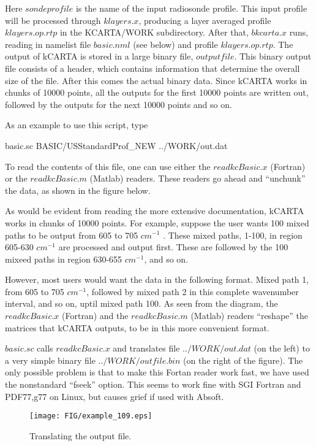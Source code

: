 \documentclass[11pt]{article}
\newcommand{\kc}{\textsf{kCARTA}\xspace}
\begin{document}
Here $sondeprofile$ is the name of the input radiosonde profile. 
This input profile will be processed through $klayers.x$, producing a layer
averaged profile $klayers.op.rtp$ in the KCARTA/WORK subdirectory. After that,
$bkcarta.x$ runs, reading in namelist file $basic.nml$ (see below) and profile
$klayers.op.rtp$. The output of \kc is stored in a large binary file,
$outputfile$.  This binary output file consists of a header, which
contains information that determine the overall size of the file. After this 
comes the actual binary data. Since \kc works in chunks of 10000 points, 
all the outputs for the first 10000 points are written out, followed by the
outputs for the next 10000 points and so on. 

As an example to use this script, type 
\begin{center}
basic.sc BASIC/USStandardProf\_NEW ../WORK/out.dat
\end{center}

To read the contents of this file, one can use either the $readkcBasic.x$ 
(Fortran) or the $readkcBasic.m$ (Matlab) readers. These readers go ahead 
and ``unchunk'' the data, as shown in the figure below. 

As would be evident from reading the more extensive documentation, \kc works 
in chunks of 10000 points. For example, suppose the user wants 100 mixed 
paths to be output from 605 to 705 $cm^{-1}$ . These mixed paths, 1-100, in 
region 605-630 $cm^{-1}$ are processed and output first. These are followed 
by the 100 mixeed paths in region 630-655 $cm^{-1}$, and so on.

However, most users would want the data in the following format. Mixed path 
1, from 605 to 705 $cm^{-1}$, followed by mixed path 2 in this complete 
wavenumber interval, and so on, uptil mixed path 100. As seen from the 
diagram, the  $readkcBasic.x$ (Fortran) and the $readkcBasic.m$ (Matlab) 
readers ``reshape'' the matrices that \kc outputs, to be in this more
convenient format.

$basic.sc$ calls $readkcBasic.x$ and translates file $../WORK/out.dat$ 
(on the left) to a very simple binary file $../WORK/outfile.bin$ 
(on the right of the figure). The only possible problem is that to make this
Fortan reader work fast, we have used the nonstandard ``fseek'' option. 
This seems to work fine with SGI Fortran and PDF77,g77 on Linux, but causes 
grief if used with Absoft.

\begin{figure}
\texttt{[image: FIG/example\_109.eps]}
\caption{Translating the output file.}
\end{figure}
\end{document}
